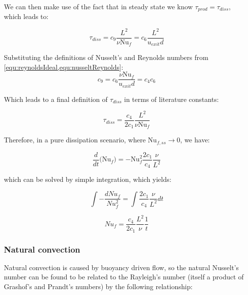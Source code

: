 \noindent We can then make use of the fact that in steady state we know $\tau_{prod} = \tau_{diss}$, which leads to:

\begin{equation}
\tau_{diss} = c_9 \frac{L^2}{\nu \text{Nu}_f} = c_6 \frac{L^2}{u_{exit} d}
\end{equation}

\noindent  Substituting the definitions of Nusselt's and Reynolds numbers from \cref{equ:reynoldsIdeal,equ:nusseltReynolds}:
\begin{equation}
c_9 = c_6 \frac{\nu\text{Nu}_f}{u_{exit}d} = c_4 c_6
\end{equation}

\noindent Which leads to a final definition of $\tau_{diss}$ in terms of literature constants:

\begin{equation}
\tau_{diss} = \frac{c_4}{2c_1}  \frac{L^2}{\nu \text{Nu}_f}
\end{equation}

\noindent Therefore, in a pure dissipation scenario, where $\text{Nu}_{f,ss} \rightarrow 0$, we have:

\begin{equation}
\frac{d}{dt}\Big(\text{Nu}_f \Big) = -\text{Nu}_f^2  \frac{2c_1}{c_4}\frac{\nu}{L^2}
\end{equation}

\noindent which can be solved by simple integration, which yields:

\begin{equation}
\int - \frac{dNu_f}{Nu_f^2} = \int \frac{2c_1}{c_4} \frac{\nu}{L^2} dt
\end{equation}

\begin{equation}
Nu_f = \frac{c_4}{2c_1} \frac{L^2}{\nu} \frac{1}{t}
\end{equation}


\subsubsection{Natural convection}
\label{sec:naturalConvection}

Natural convection is caused by buoyancy driven flow, so the natural Nusselt's number can be found to be related to the Rayleigh's number (itself a product of Grashof's and Prandt's numbers) by the following relationship:


